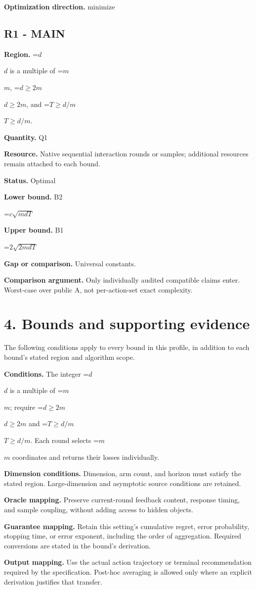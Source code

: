 \documentclass[10pt,a4paper]{article}
\newcommand{\AtlasMath}[1]{\par\begingroup\centering\setbox0=\hbox{$\displaystyle #1$}\ifdim\wd0>1.4\linewidth\typeout{ATLAS WIDE FORMULA: \the\wd0}\fi\ifdim\wd0>\linewidth\resizebox{\linewidth}{!}{\box0}\else\box0\fi\par\endgroup}
\newcommand{\AtlasInlineMath}[1]{\begingroup\setbox0=\hbox{$#1$}\ifdim\wd0>.4\linewidth\endgroup\AtlasMath{#1}\else\endgroup$#1$\fi}
\begin{document}
\textbf{Optimization direction.} minimize

\subsection{R1 - MAIN}
\textbf{Region.} \AtlasInlineMath{d} is a multiple of \AtlasInlineMath{m}, \AtlasInlineMath{d\ge2m}, and \AtlasInlineMath{T\ge d/m}.

\textbf{Quantity.} Q1

\textbf{Resource.} Native sequential interaction rounds or samples; additional resources remain attached to each bound.

\textbf{Status.} Optimal

\textbf{Lower bound.} B2

\AtlasMath{c \sqrt{mdT}}
\textbf{Upper bound.} B1

\AtlasMath{2\sqrt{2mdT}}
\textbf{Gap or comparison.} Universal constants.

\textbf{Comparison argument.} Only individually audited compatible claims enter. Worst-case over public A, not per-action-set exact complexity.

\section{4. Bounds and supporting evidence}
The following conditions apply to every bound in this profile, in addition to each bound's stated region and algorithm scope.

\textbf{Conditions.} The integer \AtlasInlineMath{d} is a multiple of \AtlasInlineMath{m}; require \AtlasInlineMath{d\ge2m} and \AtlasInlineMath{T\ge d/m}. Each round selects \AtlasInlineMath{m} coordinates and returns their losses individually.

\textbf{Dimension conditions.} Dimension, arm count, and horizon must satisfy the stated region. Large-dimension and asymptotic source conditions are retained.

\textbf{Oracle mapping.} Preserve current-round feedback content, response timing, and sample coupling, without adding access to hidden objects.

\textbf{Guarantee mapping.} Retain this setting's cumulative regret, error probability, stopping time, or error exponent, including the order of aggregation. Required conversions are stated in the bound's derivation.

\textbf{Output mapping.} Use the actual action trajectory or terminal recommendation required by the specification. Post-hoc averaging is allowed only where an explicit derivation justifies that transfer.
\end{document}
